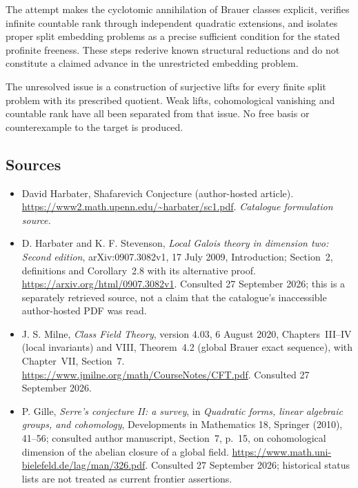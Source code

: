 \documentclass[11pt,a4paper]{article}
\numberwithin{equation}{section}
\begin{document}
The attempt makes the cyclotomic annihilation of Brauer classes explicit,
verifies infinite countable rank through independent quadratic
extensions, and isolates proper split embedding problems as a precise
sufficient condition for the stated profinite freeness. These steps
rederive known structural reductions and do not constitute a claimed
advance in the unrestricted embedding problem.

The unresolved issue is a construction of surjective lifts for every
finite split problem with its prescribed quotient. Weak lifts,
cohomological vanishing and countable rank have all been separated from
that issue. No free basis or counterexample to the target is produced.
\subsection{Sources}
\begin{itemize}\raggedright
\item[\textnormal{[S1]}]\hypertarget{source:230:1}{} David Harbater, Shafarevich Conjecture (author-hosted article).
\url{https://www2.math.upenn.edu/~harbater/sc1.pdf}.
{\small\textit{Catalogue formulation source.}}
\item[\textnormal{[E1]}]\hypertarget{extra:230:1}{}
D. Harbater and K. F. Stevenson, \emph{Local Galois theory in dimension
two: Second edition}, arXiv:0907.3082v1, 17 July 2009, Introduction;
Section~2, definitions and Corollary~2.8 with its alternative proof.
\url{https://arxiv.org/html/0907.3082v1}.
Consulted 27 September 2026; this is a separately retrieved source,
not a claim that the catalogue's inaccessible author-hosted PDF was read.
\item[\textnormal{[E2]}]\hypertarget{extra:230:2}{}
J. S. Milne, \emph{Class Field Theory}, version 4.03, 6 August 2020,
Chapters~III--IV (local invariants) and VIII, Theorem~4.2 (global Brauer
exact sequence), with Chapter~VII, Section~7.
\url{https://www.jmilne.org/math/CourseNotes/CFT.pdf}.
Consulted 27 September 2026.
\item[\textnormal{[E3]}]\hypertarget{extra:230:3}{}
P. Gille, \emph{Serre's conjecture II: a survey}, in \emph{Quadratic
forms, linear algebraic groups, and cohomology}, Developments in
Mathematics 18, Springer (2010), 41--56; consulted author manuscript,
Section~7, p.~15, on cohomological dimension of the abelian closure of a
global field. \url{https://www.math.uni-bielefeld.de/lag/man/326.pdf}.
Consulted 27 September 2026; historical status lists are not treated as
current frontier assertions.
\end{itemize}
\end{document}
